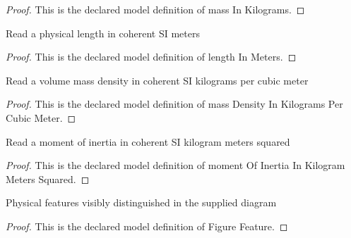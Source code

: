 \begin{proof}
  This is the declared model definition of mass In Kilograms.
\end{proof}
\begin{definition}
  \label{def:physics:phyx-mini-0822:phyxminiproblems-problemphyxmini0822-lengthinmeters}
  Read a physical length in coherent SI meters
\end{definition}
\begin{proof}
  This is the declared model definition of length In Meters.
\end{proof}
\begin{definition}
  \label{def:physics:phyx-mini-0822:phyxminiproblems-problemphyxmini0822-massdensityinkilogramspercubicmeter}
  Read a volume mass density in coherent SI kilograms per cubic meter
\end{definition}
\begin{proof}
  This is the declared model definition of mass Density In Kilograms Per Cubic Meter.
\end{proof}
\begin{definition}
  \label{def:physics:phyx-mini-0822:phyxminiproblems-problemphyxmini0822-momentofinertiainkilogrammeterssquared}
  Read a moment of inertia in coherent SI kilogram meters squared
\end{definition}
\begin{proof}
  This is the declared model definition of moment Of Inertia In Kilogram Meters Squared.
\end{proof}
\begin{definition}
  \label{def:physics:phyx-mini-0822:phyxminiproblems-problemphyxmini0822-figurefeature}
  Physical features visibly distinguished in the supplied diagram
\end{definition}
\begin{proof}
  This is the declared model definition of Figure Feature.
\end{proof}
